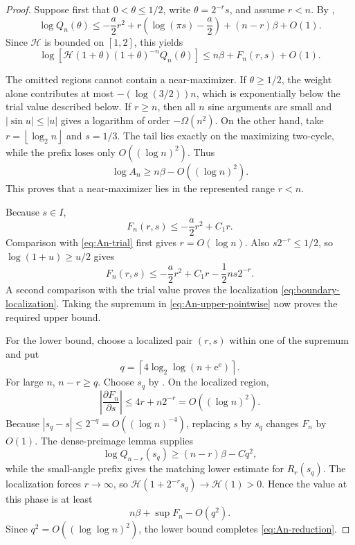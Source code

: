 \documentclass[11pt,oneside]{article}
\numberwithin{equation}{section}
\theoremstyle{definition}
\theoremstyle{remark}
\newcommand{\e}{\mathrm e}
\newcommand{\floor}[1]{\left\lfloor#1\right\rfloor}
\newcommand{\ceil}[1]{\left\lceil#1\right\rceil}
\begin{document}
\begin{proof}
Suppose first that \(0<\theta\le1/2\), write \(\theta=2^{-r}s\), and assume \(r<n\).
By ,
\[
 \log Q_n(\theta)
 \le -\frac a2r^2+r\left(\log(\pi s)-\frac a2\right)
 +(n-r)\beta+O(1).
\]
Since \(\mathcal H\) is bounded on \([1,2]\), this yields
\begin{equation}
 \log\!\left[
 \mathcal H(1+\theta)(1+\theta)^{-n}Q_n(\theta)
 \right]
 \le n\beta+F_n(r,s)+O(1).
 \label{eq:An-upper-pointwise}
\end{equation}

The omitted regions cannot contain a near-maximizer.  If \(\theta\ge1/2\), the weight alone
contributes at most \(-(\log(3/2))n\), which is exponentially below the trial value described
below.  If \(r\ge n\), then all \(n\) sine arguments are small and
\(|\sin u|\le|u|\) gives a logarithm of order \(-\Omega(n^2)\).
On the other hand, take \(r=\floor{\log_2 n}\) and \(s=1/3\).  The tail lies exactly on
the maximizing two-cycle, while the prefix loses only \(O((\log n)^2)\).  Thus
\begin{equation}
 \log A_n\ge n\beta-O((\log n)^2).
 \label{eq:An-trial}
\end{equation}
This proves that a near-maximizer lies in the represented range \(r<n\).

Because \(s\in I\),
\[
 F_n(r,s)\le-\frac a2r^2+C_1r.
\]
Comparison with \eqref{eq:An-trial} first gives \(r=O(\log n)\).  Also
\(s2^{-r}\le1/2\), so \(\log(1+u)\ge u/2\) gives
\[
 F_n(r,s)\le-\frac a2r^2+C_1r-\frac12ns2^{-r}.
\]
A second comparison with the trial value proves the localization
\eqref{eq:boundary-localization}.  Taking the supremum in
\eqref{eq:An-upper-pointwise} now proves the required upper bound.

For the lower bound, choose a localized pair \((r,s)\) within one of the supremum and put
\[
 q=\ceil{4\log_2\log(n+\e^{\e})}.
\]
For large \(n\), \(n-r\ge q\).  Choose \(s_q\) by
.  On the localized region,
\[
 \left|\frac{\partial F_n}{\partial s}\right|
 \le4r+n2^{-r}=O((\log n)^2).
\]
Because \(|s_q-s|\le2^{-q}=O((\log n)^{-4})\), replacing \(s\) by \(s_q\) changes
\(F_n\) by \(O(1)\).  The dense-preimage lemma supplies
\[
 \log Q_{n-r}(s_q)\ge(n-r)\beta-Cq^2,
\]
while the small-angle prefix gives the matching lower estimate for \(R_r(s_q)\).
The localization forces \(r\to\infty\), so
\(\mathcal H(1+2^{-r}s_q)\to\mathcal H(1)>0\).  Hence the value at this phase is at least
\[
 n\beta+\sup F_n-O(q^2).
\]
Since \(q^2=O((\log\log n)^2)\), the lower bound completes
\eqref{eq:An-reduction}.
\end{proof}
\end{document}
